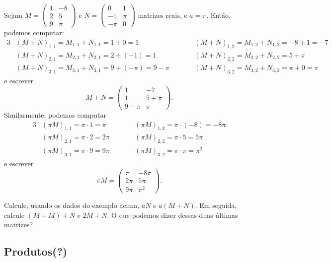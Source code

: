 \begin{ex}
	Sejam $M=\begin{pmatrix}
	1 & -8\\
	2 & 5\\
	9 & \pi
	\end{pmatrix}$ e $N=\begin{pmatrix}
	0 & 1\\
	-1 & \pi\\
	-\pi &0
	\end{pmatrix}$ matrizes reais, e $a=\pi$. Então, podemos computar:
	\begin{alignat*}{3}
	&(M+N)_{1,1}=M_{1,1}+N_{1,1}=1+0=1\quad&\quad&(M+N)_{1,2}=M_{1,2}+N_{1,2}=-8+1=-7\\
	&(M+N)_{2,1}=M_{2,1}+N_{2,1}=2+(-1)=1\quad&\quad&(M+N)_{2,2}=M_{2,2}+N_{2,2}=5+\pi\\
	&(M+N)_{3,1}=M_{3,1}+N_{3,1}=9+(-\pi)=9-\pi\quad&\quad&(M+N)_{3,2}=M_{3,2}+N_{3,2}=\pi+0=\pi
	\end{alignat*}e escrever
	\[M+N=\begin{pmatrix}
	1 & -7\\
	1 & 5+\pi\\
	9-\pi & \pi
	\end{pmatrix}.\]
	\tcblower
	Similarmente, podemos computar
	\begin{alignat*}{3}
	&(\pi M)_{1,1}=\pi\cdot 1=\pi\quad&\quad &(\pi M)_{1,2}=\pi\cdot (-8)=-8\pi\\
	&(\pi M)_{2,1}=\pi\cdot 2 = 2\pi\quad&\quad &(\pi M)_{2,2}=\pi\cdot 5 = 5\pi\\
	&(\pi M)_{3,1}=\pi\cdot 9 = 9\pi\quad&\quad 	&(\pi M)_{3,2}=\pi\cdot \pi=\pi^2
	\end{alignat*}e escrever
	\[\pi M=\begin{pmatrix}
	\pi & -8\pi\\
	2\pi & 5\pi\\
	9\pi &\pi^2
	\end{pmatrix}.\]
\end{ex}

\begin{exerc}
	Calcule, usando os dados do exemplo acima, $aN$ e $a(M+N)$. Em seguida, calcule $(M+M)+N$ e $2M+N$. O que podemos dizer dessas duas últimas matrizes?
\end{exerc}

\subsection{Produtos(?)}

